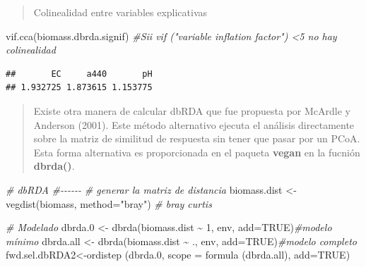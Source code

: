 \documentclass[
]{book}
\newenvironment{Shaded}{\begin{snugshade}}{\end{snugshade}}
\newcommand{\AttributeTok}[1]{\textcolor[rgb]{0.77,0.63,0.00}{#1}}
\newcommand{\CommentTok}[1]{\textcolor[rgb]{0.56,0.35,0.01}{\textit{#1}}}
\newcommand{\ConstantTok}[1]{\textcolor[rgb]{0.00,0.00,0.00}{#1}}
\newcommand{\DecValTok}[1]{\textcolor[rgb]{0.00,0.00,0.81}{#1}}
\newcommand{\FloatTok}[1]{\textcolor[rgb]{0.00,0.00,0.81}{#1}}
\newcommand{\FunctionTok}[1]{\textcolor[rgb]{0.00,0.00,0.00}{#1}}
\newcommand{\NormalTok}[1]{#1}
\newcommand{\OtherTok}[1]{\textcolor[rgb]{0.56,0.35,0.01}{#1}}
\newcommand{\SpecialCharTok}[1]{\textcolor[rgb]{0.00,0.00,0.00}{#1}}
\newcommand{\StringTok}[1]{\textcolor[rgb]{0.31,0.60,0.02}{#1}}
\begin{document}
\begin{quote}
Colinealidad entre variables explicativas
\end{quote}

\begin{Shaded}
\begin{Highlighting}[]
\FunctionTok{vif.cca}\NormalTok{(biomass.dbrda.signif) }\CommentTok{\#Sii vif ("variable inflation factor") \textless{}5 no hay colinealidad}
\end{Highlighting}
\end{Shaded}

\begin{verbatim}
##       EC     a440       pH 
## 1.932725 1.873615 1.153775
\end{verbatim}

\begin{quote}
Existe otra manera de calcular dbRDA que fue propuesta por McArdle y Anderson (2001). Este método alternativo ejecuta el análisis directamente sobre la matriz de similitud de respuesta sin tener que pasar por un PCoA. Esta forma alternativa es proporcionada en el paqueta \textbf{vegan} en la fucnión \textbf{dbrda()}.
\end{quote}

\begin{Shaded}
\begin{Highlighting}[]
\CommentTok{\# dbRDA}
\CommentTok{\#{-}{-}{-}{-}{-}{-}}
\CommentTok{\# generar la matriz de distancia}
\NormalTok{biomass.dist }\OtherTok{\textless{}{-}} \FunctionTok{vegdist}\NormalTok{(biomass, }\AttributeTok{method=}\StringTok{"bray"}\NormalTok{) }\CommentTok{\# bray curtis}
\end{Highlighting}
\end{Shaded}

\begin{Shaded}
\begin{Highlighting}[]
\CommentTok{\# Modelado}
\NormalTok{dbrda}\FloatTok{.0} \OtherTok{\textless{}{-}} \FunctionTok{dbrda}\NormalTok{(biomass.dist }\SpecialCharTok{\textasciitilde{}} \DecValTok{1}\NormalTok{, env, }\AttributeTok{add=}\ConstantTok{TRUE}\NormalTok{)}\CommentTok{\#modelo mínimo}
\NormalTok{dbrda.all }\OtherTok{\textless{}{-}} \FunctionTok{dbrda}\NormalTok{(biomass.dist }\SpecialCharTok{\textasciitilde{}}\NormalTok{ ., env, }\AttributeTok{add=}\ConstantTok{TRUE}\NormalTok{)}\CommentTok{\#modelo completo}
\NormalTok{fwd.sel.dbRDA2}\OtherTok{\textless{}{-}}\FunctionTok{ordistep}\NormalTok{ (dbrda}\FloatTok{.0}\NormalTok{, }\AttributeTok{scope =} \FunctionTok{formula}\NormalTok{ (dbrda.all), }\AttributeTok{add=}\ConstantTok{TRUE}\NormalTok{)}
\end{Highlighting}
\end{Shaded}
\end{document}
